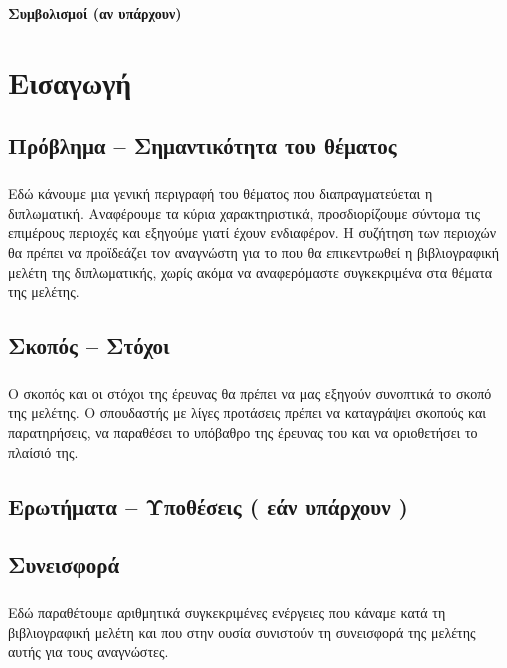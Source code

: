 \documentclass[12pt]{article}
\begin{document}
\clearpage
\singlespacing
\tableofcontents
{}

\renewcommand{\listfigurename}{Κατάλογος Εικόνων (αν υπάρχουν)}
\clearpage
\listoffigures

\renewcommand{\listtablename}{Κατάλογος Πινάκων (αν υπάρχουν)}
\clearpage
\listoftables

\clearpage
\begin{flushleft}
{\large \textbf{Συμβολισμοί (αν υπάρχουν)}}\\[0.5 cm]
\end{flushleft}

\clearpage
\setcounter{page}{1}

\section{Εισαγωγή}
\subsection{Πρόβλημα – Σημαντικότητα του θέματος}
\subparagraph{}
Εδώ κάνουμε μια γενική περιγραφή του θέματος που διαπραγματεύεται η διπλωματική. Αναφέρουμε τα κύρια χαρακτηριστικά, προσδιορίζουμε σύντομα τις επιμέρους περιοχές και εξηγούμε γιατί έχουν ενδιαφέρον. Η συζήτηση των περιοχών θα πρέπει να προϊδεάζει τον αναγνώστη για το που θα επικεντρωθεί η βιβλιογραφική μελέτη της διπλωματικής, χωρίς ακόμα να αναφερόμαστε συγκεκριμένα στα θέματα της μελέτης.

 \newpage
 \subsection{Σκοπός – Στόχοι}
\subparagraph{}
Ο σκοπός και οι στόχοι της έρευνας θα πρέπει να μας εξηγούν συνοπτικά το σκοπό της μελέτης. Ο σπουδαστής με λίγες προτάσεις πρέπει να καταγράψει σκοπούς και παρατηρήσεις, να παραθέσει το υπόβαθρο της έρευνας του και να οριοθετήσει το πλαίσιό της.

\subsection{Ερωτήματα – Υποθέσεις ( εάν υπάρχουν )}

\subsection{Συνεισφορά}
\subparagraph{}
Εδώ παραθέτουμε αριθμητικά συγκεκριμένες ενέργειες που κάναμε κατά τη βιβλιογραφική μελέτη και που στην ουσία συνιστούν τη συνεισφορά της μελέτης αυτής για τους αναγνώστες.
\end{document}

